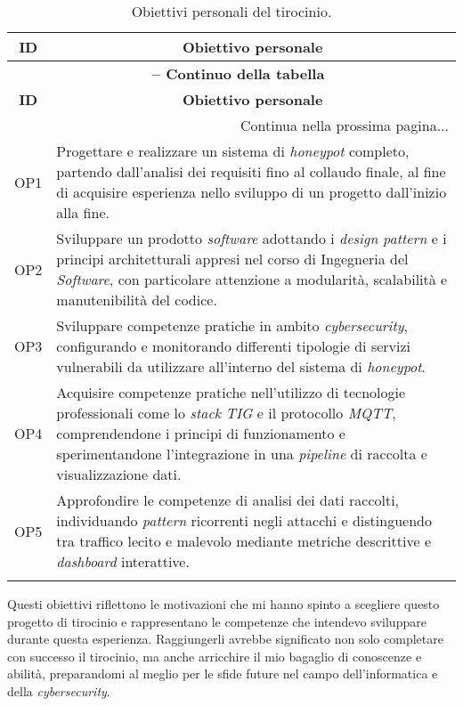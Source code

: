 \begin{center}
\begin{longtable}{|p{}|p{}|}
\hline
\multicolumn{1}{|c|}{\textbf{ID}} & \multicolumn{1}{c|}{\textbf{Obiettivo personale}}\\ 
\hline 
\endfirsthead
\multicolumn{2}{c}{{\bfseries \tablename\ \thetable{} -- Continuo della tabella}}\\
\hline
\multicolumn{1}{|c|}{\textbf{ID}} & \multicolumn{1}{c|}{\textbf{Obiettivo personale}}\\ \hline 
\endhead
\hline
\multicolumn{2}{|r|}{{Continua nella prossima pagina...}}\\
\hline
\endfoot
\endlastfoot 

OP1 & Progettare e realizzare un sistema di \textit{honeypot} completo, partendo dall'analisi dei requisiti fino al collaudo finale, al fine di acquisire esperienza nello sviluppo di un progetto dall'inizio alla fine. \\ \hline
OP2 & Sviluppare un prodotto \textit{software} adottando i \textit{design pattern} e i principi architetturali appresi nel corso di Ingegneria del \textit{Software}, con particolare attenzione a modularità, scalabilità e manutenibilità del codice. \\ \hline
OP3 & Sviluppare competenze pratiche in ambito \textit{cybersecurity}, configurando e monitorando differenti tipologie di servizi vulnerabili da utilizzare all'interno del sistema di \textit{honeypot}. \\ \hline
OP4 & Acquisire competenze pratiche nell'utilizzo di tecnologie professionali come lo \textit{stack} \textit{TIG} e il protocollo \textit{MQTT}, comprendendone i principi di funzionamento e sperimentandone l'integrazione in una \textit{pipeline} di raccolta e visualizzazione dati. \\ \hline
OP5 & Approfondire le competenze di analisi dei dati raccolti, individuando \textit{pattern} ricorrenti negli attacchi e distinguendo tra traffico lecito e malevolo mediante metriche descrittive e \textit{dashboard} interattive. \\ \hline

\caption{Obiettivi personali del tirocinio.}
\label{tab:obiettivi-personali}
\end{longtable}
\end{center}
Questi obiettivi riflettono le motivazioni che mi hanno spinto a scegliere questo progetto di tirocinio e rappresentano le competenze che intendevo sviluppare durante questa esperienza. Raggiungerli avrebbe significato non solo completare con successo il tirocinio, ma anche arricchire il mio bagaglio di conoscenze e abilità, preparandomi al meglio per le sfide future nel campo dell'informatica e della \textit{cybersecurity}.